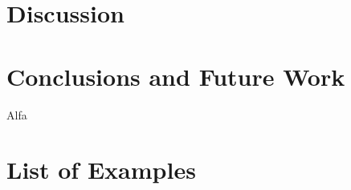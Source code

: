 \documentclass[final,5p,times,twocolumn]{elsarticle}
\begin{document}

\section{Discussion}
\label{sec:discussion}



\section{Conclusions and Future Work}
\label{sec:conclusions_and_future_work}

Alfa \cite{cormen2009introduction}

\appendix

\section{List of Examples}
\label{sec:list_of_examples}
\end{document}
